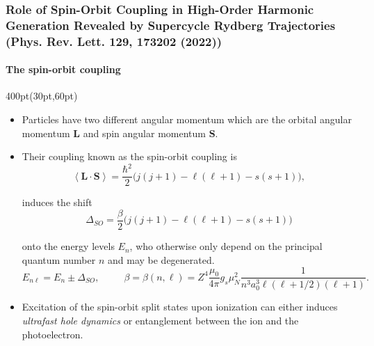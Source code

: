 \begin{frame}
\frametitle{
Role of Spin-Orbit Coupling in High-Order Harmonic Generation
Revealed by Supercycle Rydberg Trajectories
\footnotesize (Phys. Rev. Lett. 129, 173202 (2022))
}
	\framesubtitle{The spin-orbit coupling}
\small
\footnotesize
\begin{textblock*}{400pt}(30pt,60pt)
\begin{itemize}
\item Particles have two different angular momentum which are 
the orbital angular momentum $\boldsymbol{L}$
and spin angular momentum $\boldsymbol{S}.$
\item Their coupling known as the spin-orbit coupling is
\begin{equation}
\left\langle \boldsymbol{L}\cdot\boldsymbol{S} \right\rangle =  
  \frac{\hbar^2}{2}\Big( j(j+1)-\ell(\ell+1) - s(s+1)\Big),
\end{equation}

\noindent induces the shift 
\begin{equation}
\Delta_{SO} =  
  \frac{\beta}{2}\Big( j(j+1)-\ell(\ell+1) - s(s+1)\Big)
\end{equation}

\noindent onto the energy levels $E_n$, who otherwise only depend on
the principal quantum number $n$ and may be degenerated.
\begin{equation}
E_{n\ell} = E_n \pm \Delta_{SO}, \hspace{30pt}
  \beta = \beta(n,\ell) =
     Z^4\frac{\mu_0 }{4\pi}g_s\mu_N^2\frac{1}{n^3a_0^3\ell(\ell+1/2)(\ell+1)}.
\end{equation}
\item Excitation of the spin-orbit split states upon ionization 
can either induces \textit{ultrafast hole dynamics} or entanglement
between the ion and the photoelectron.
\end{itemize}
\end{textblock*}




\end{frame}




